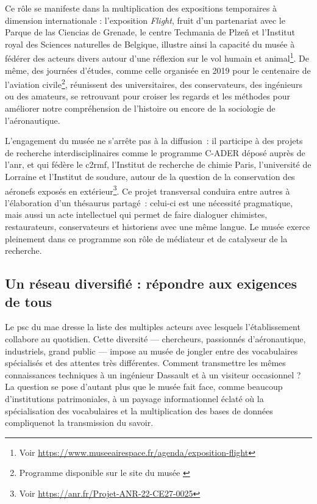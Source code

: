 Ce rôle se manifeste dans la multiplication des expositions temporaires à dimension internationale : l’exposition \emph{Flight}, fruit d’un partenariat avec le Parque de las Ciencias de Grenade, le centre Techmania de Plzeň et l’Institut royal des Sciences naturelles de Belgique, illustre ainsi la capacité du musée à fédérer des acteurs divers autour d’une réflexion sur le vol humain et animal\footnote{Voir \href{https://www.museeairespace.fr/agenda/exposition-flight}{https://www.museeairespace.fr/agenda/exposition-flight}}. De même, des journées d’études, comme celle organisée en 2019 pour le centenaire de l’aviation civile\footnote{Programme disponible sur le site du musée \cite{19192019CentAns}}, réunissent des universitaires, des conservateurs, des ingénieurs ou des amateurs, se retrouvant pour croiser les regards et les méthodes pour améliorer notre compréhension de l'histoire ou encore de la sociologie de l'aéronautique.

L’engagement du musée ne s’arrête pas à la diffusion : il participe à des projets de recherche interdisciplinaires comme le programme C-ADER déposé auprès de l'\ac{anr}, et qui fédère le \ac{c2rmf}, l’Institut de recherche de chimie Paris, l’université de Lorraine et l’Institut de soudure, autour de la  question de la conservation des aéronefs exposés en extérieur\footnote{Voir  \href{https://anr.fr/Projet-ANR-22-CE27-0025}{https://anr.fr/Projet-ANR-22-CE27-0025}}. Ce projet transversal conduira entre autres à l’élaboration d’un thésaurus partagé : celui-ci est une nécessité pragmatique, mais aussi un acte intellectuel qui permet de faire dialoguer chimistes, restaurateurs, conservateurs et historiens avec une même langue. Le musée exerce pleinement dans ce programme son rôle de médiateur et de catalyseur de la recherche.

\subsection{Un réseau diversifié : répondre aux exigences de tous}

Le \ac{psc} du \ac{mae} dresse la liste des multiples acteurs avec lesquels l'établissement collabore au quotidien. Cette diversité — chercheurs, passionnés d'aéronautique, industriels, grand public — impose au musée de jongler entre des vocabulaires spécialisés et des attentes très différentes. Comment transmettre les mêmes connaissances techniques à un ingénieur Dassault et à un visiteur occasionnel ? La question se pose d'autant plus que le musée fait face, comme beaucoup d'institutions patrimoniales, à un paysage informationnel éclaté où la spécialisation des vocabulaires et la multiplication des bases de données compliquenot la transmission du savoir.

